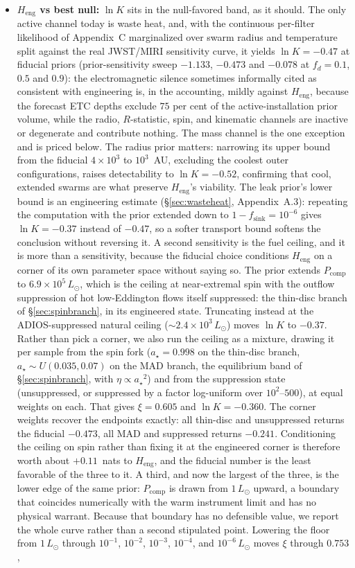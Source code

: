 \documentclass[11pt]{article}
\newcommand{\astar}{\ensuremath{a_\star}}
\newcommand{\lnK}{\ensuremath{\ln K}}
\newcommand{\Heng}{\ensuremath{H_{\mathrm{eng}}}}
\begin{document}
\begin{itemize}
\item \textbf{\Heng{} vs best null:} \lnK{} sits in the null-favored band, as it should. The only active channel today is waste heat, and, with the continuous per-filter likelihood of Appendix~C marginalized over swarm radius and temperature split against the real JWST/MIRI sensitivity curve, it yields $\lnK = -0.47$ at fiducial priors (prior-sensitivity sweep $-1.133$, $-0.473$ and $-0.078$ at $f_{d} = 0.1$, $0.5$ and $0.9$): the electromagnetic silence sometimes informally cited as consistent with engineering is, in the accounting, mildly against \Heng, because the forecast ETC depths exclude $75$ per cent of the active-installation prior volume, while the radio, $R$-statistic, spin, and kinematic channels are inactive or degenerate and contribute nothing. The mass channel is the one exception and is priced below. The radius prior matters: narrowing its upper bound from the fiducial $4\times10^{3}$ to $10^{3}$~AU, excluding the coolest outer configurations, raises detectability to $\lnK = -0.52$, confirming that cool, extended swarms are what preserve \Heng's viability. The leak prior's lower bound is an engineering estimate (\S\ref{sec:wasteheat}, Appendix~A.3): repeating the computation with the prior extended down to $1-f_{\mathrm{sink}} = 10^{-6}$ gives $\lnK = -0.37$ instead of $-0.47$, so a softer transport bound softens the conclusion without reversing it. A second sensitivity is the fuel ceiling, and it is more than a sensitivity, because the fiducial choice conditions \Heng{} on a corner of its own parameter space without saying so. The prior extends $P_{\mathrm{comp}}$ to $6.9\times10^{5}\,L_{\odot}$, which is the ceiling at near-extremal spin with the outflow suppression of hot low-Eddington flows itself suppressed: the thin-disc branch of \S\ref{sec:spinbranch}, in its engineered state. Truncating instead at the ADIOS-suppressed natural ceiling ($\sim 2.4\times10^{3}\,L_{\odot}$) moves \lnK{} to $-0.37$. Rather than pick a corner, we also run the ceiling as a mixture, drawing it per sample from the spin fork ($\astar = 0.998$ on the thin-disc branch, $\astar \sim U(0.035, 0.07)$ on the MAD branch, the equilibrium band of \S\ref{sec:spinbranch}, with $\eta \propto \astar^{2}$) and from the suppression state (unsuppressed, or suppressed by a factor log-uniform over $10^{2}$--$500$), at equal weights on each. That gives $\xi = 0.605$ and $\lnK = -0.360$. The corner weights recover the endpoints exactly: all thin-disc and unsuppressed returns the fiducial $-0.473$, all MAD and suppressed returns $-0.241$. Conditioning the ceiling on spin rather than fixing it at the engineered corner is therefore worth about $+0.11$~nats to \Heng, and the fiducial number is the least favorable of the three to it. A third, and now the largest of the three, is the lower edge of the same prior: $P_{\mathrm{comp}}$ is drawn from $1\,L_{\odot}$ upward, a boundary that coincides numerically with the warm instrument limit and has no physical warrant. Because that boundary has no defensible value, we report the whole curve rather than a second stipulated point. Lowering the floor from $1\,L_{\odot}$ through $10^{-1}$, $10^{-2}$, $10^{-3}$, $10^{-4}$, and $10^{-6}\,L_{\odot}$ moves $\xi$ through $0.753$, 
\end{itemize}
\end{document}
